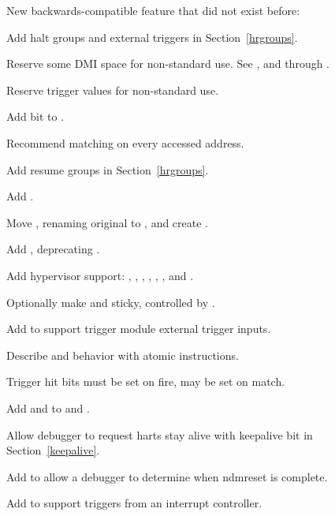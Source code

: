 \begin{steps}{New backwards-compatible feature that did not exist before:}
    \item Add halt groups and external triggers in Section~\ref{hrgroups}. 
    \item Reserve some DMI space for non-standard use. See \RdmCustom, and
        \RdmCustomZero through \RdmCustomFifteen. 
    \item Reserve trigger \FcsrTdataOneType values for non-standard use. 
    \item Add \FcsrEtriggerNmi bit to \RcsrEtrigger. 
    \item Recommend matching on every accessed address. 
    \item Add resume groups in Section~\ref{hrgroups}. 
    \item Add \FdmAbstractcsRelaxedpriv. 
    \item Move \RcsrScontext, renaming original to \RcsrMscontext, and create
        \RcsrHcontext. 
    \item Add \RcsrMcontrolSix, deprecating \RcsrMcontrol. 
    \item Add hypervisor support: \FcsrDcsrEbreakvs, \FcsrDcsrEbreakvu,
        \FcsrDcsrV, \RcsrHcontext, \RcsrMcontrol, \RcsrMcontrolSix, and
        \RvirtPriv. 
    \item Optionally make \FdmDmstatusAnyunavail and \FdmDmstatusAllunavail
    sticky, controlled by \FdmDmstatusStickyunavail. 
    \item Add \RcsrTmexttrigger to support trigger module external trigger
        inputs. 
    \item Describe \RcsrMcontrol and \RcsrMcontrolSix behavior with atomic instructions. 
    \item Trigger hit bits must be set on fire, may be set on match. 
    \item Add \FcsrTextraThirtytwoSbytemask and \FcsrTextraSixtyfourSbytemask
        to \RcsrTextraThirtytwo and \RcsrTextraSixtyfour. 
    \item Allow debugger to request harts stay alive with keepalive bit in
        Section~\ref{keepalive}. 
    \item Add \FdmDmstatusNdmresetpending to allow a debugger to determine
        when ndmreset is complete. 
    \item Add \FcsrTmexttriggerIntctl to support triggers from an interrupt controller. 
\end{steps}
